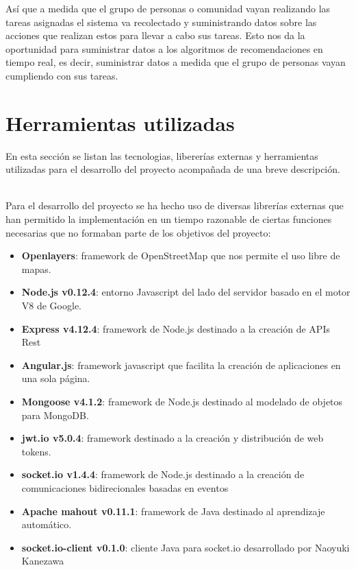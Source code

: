 Así que a medida que el grupo de personas o comunidad vayan realizando las tareas asignadas el sistema va recolectado y suministrando datos sobre las acciones que realizan estos para llevar a cabo sus tareas. Esto nos da la oportunidad para suministrar datos a los algoritmos de recomendaciones en tiempo real, es decir, suministrar datos a medida que el grupo de personas vayan cumpliendo con sus tareas.   

\section{Herramientas utilizadas}

En esta sección se listan las tecnologias, libererías externas y herramientas utilizadas para el desarrollo del proyecto acompañada de una breve descripción.

\\

Para el desarrollo del proyecto se ha hecho uso de diversas librerías externas que han permitido la implementación en un tiempo razonable de ciertas funciones necesarias que no formaban parte de los objetivos del proyecto:

\begin{itemize}
       \item {\bfseries Openlayers}: framework de OpenStreetMap que nos permite el uso libre de mapas.
       \item {\bfseries Node.js v0.12.4}: entorno Javascript del lado del servidor basado en el motor V8 de Google. 
       \item {\bfseries Express v4.12.4}: framework de Node.js destinado a la creación de APIs Rest
       \item {\bfseries Angular.js}: framework javascript que facilita la creación de aplicaciones en una sola página. 
       \item {\bfseries Mongoose v4.1.2}: framework de Node.js destinado al modelado de objetos para MongoDB.
       \item {\bfseries jwt.io v5.0.4}: framework destinado a la creación y distribución de web tokens. 
       \item {\bfseries socket.io v1.4.4}: framework de Node.js destinado a la creación de comunicaciones bidirecionales basadas en eventos
       \item {\bfseries Apache mahout v0.11.1}: framework de Java destinado al aprendizaje automático.
       \item {\bfseries socket.io-client v0.1.0}: cliente Java para socket.io desarrollado por Naoyuki Kanezawa
\end{itemize}


